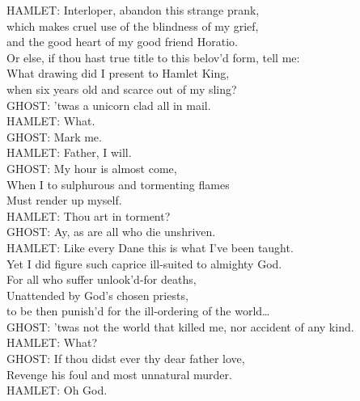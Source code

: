 \begin{playdialog}%
HAMLET: Interloper, abandon this strange prank,\\
which makes cruel use of the blindness of my grief,\\
and the good heart of my good friend Horatio.\\
Or else, if thou hast true title to this belov’d form, tell me:\\ What drawing did I present to Hamlet King,\\ when six years old and scarce out of my sling?\\

GHOST: ’twas a unicorn clad all in mail.\\

HAMLET: What.\\

GHOST: Mark me.\\

HAMLET: Father, I will.\\

GHOST: My hour is almost come,\\
When I to sulphurous and tormenting flames\\
Must render up myself.\\

HAMLET: Thou art in torment?\\

GHOST: Ay, as are all who die unshriven.\\

HAMLET: Like every Dane this is what I’ve been taught.\\
Yet I did figure such caprice ill-suited to almighty God.\\
For all who suffer unlook’d-for deaths,\\
Unattended by God’s chosen priests,\\
to be then punish’d for the ill-ordering of the world…\\

GHOST: ’twas not the world that killed me, nor accident of any kind.\\

HAMLET: What?\\

GHOST: If thou didst ever thy dear father love,\\
Revenge his foul and most unnatural murder.\\

HAMLET: Oh God.\\


\end{playdialog}
